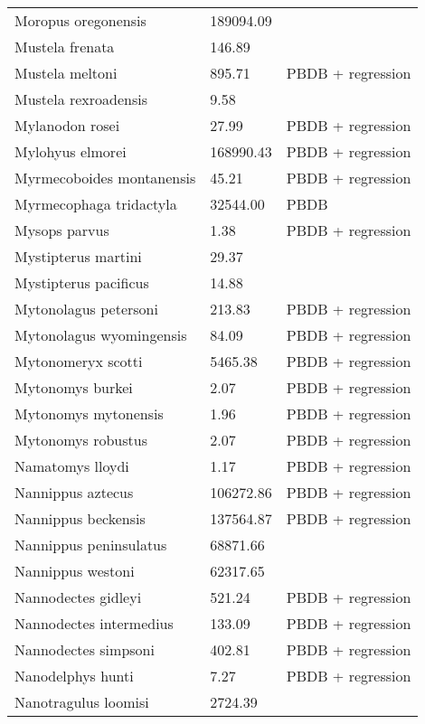 \documentclass{article}
\begin{document}
\begin{center}
\begin{longtable}{p{} p{} p{}}
    Moropus oregonensis & 189094.09 & \cite{Tomiya2013} \\ 
    Mustela frenata & 146.89 & \cite{Smith2004} \\ 
    Mustela meltoni & 895.71 & PBDB + regression \\ 
    Mustela rexroadensis & 9.58 & \cite{Tomiya2013} \\ 
    Mylanodon rosei & 27.99 & PBDB + regression \\ 
    Mylohyus elmorei & 168990.43 & PBDB + regression \\ 
    Myrmecoboides montanensis & 45.21 & PBDB + regression \\ 
    Myrmecophaga tridactyla & 32544.00 & PBDB \\ 
    Mysops parvus & 1.38 & PBDB + regression \\ 
    Mystipterus martini & 29.37 & \cite{Tomiya2013} \\ 
    Mystipterus pacificus & 14.88 & \cite{Tomiya2013} \\ 
    Mytonolagus petersoni & 213.83 & PBDB + regression \\ 
    Mytonolagus wyomingensis & 84.09 & PBDB + regression \\ 
    Mytonomeryx scotti & 5465.38 & PBDB + regression \\ 
    Mytonomys burkei & 2.07 & PBDB + regression \\ 
    Mytonomys mytonensis & 1.96 & PBDB + regression \\ 
    Mytonomys robustus & 2.07 & PBDB + regression \\ 
    Namatomys lloydi & 1.17 & PBDB + regression \\ 
    Nannippus aztecus & 106272.86 & PBDB + regression \\ 
    Nannippus beckensis & 137564.87 & PBDB + regression \\ 
    Nannippus peninsulatus & 68871.66 & \cite{Tomiya2013} \\ 
    Nannippus westoni & 62317.65 & \cite{Tomiya2013} \\ 
    Nannodectes gidleyi & 521.24 & PBDB + regression \\ 
    Nannodectes intermedius & 133.09 & PBDB + regression \\ 
    Nannodectes simpsoni & 402.81 & PBDB + regression \\ 
    Nanodelphys hunti & 7.27 & PBDB + regression \\ 
    Nanotragulus loomisi & 2724.39 & \cite{Tomiya2013} \\ 

\end{longtable}
\end{center}
\end{document}

